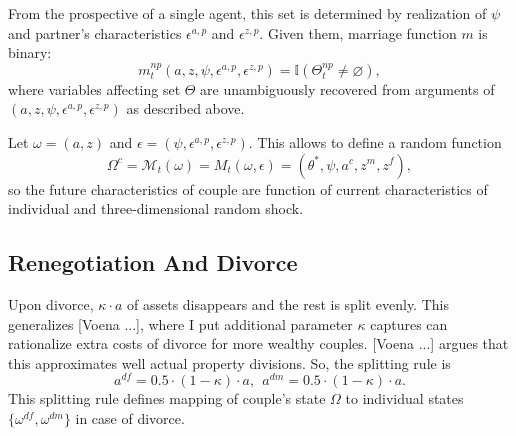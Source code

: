 \documentclass[12pt,letter]{article}
\newcommand{\I}{\mathbb{I}}
\begin{document}
From the prospective of a single agent, this set is determined by realization of $\psi$ and partner's characteristics $\epsilon^{a,p}$ and $\epsilon^{z,p}$. Given them, marriage function $m$ is binary:
\[m^{np}_t(a,z,\psi,\epsilon^{a,p},\epsilon^{z,p}) = \I(\Theta^{np}_t \neq \varnothing),\]
where variables affecting set $\Theta$ are unambiguously recovered from arguments of $(a,z,\psi,\epsilon^{a,p},\epsilon^{z,p})$ as described above.


Let $\omega = (a,z)$ and $\epsilon = (\psi,\epsilon^{a,p},\epsilon^{z,p})$. This allows to define a random function
\[\Omega^c = \mathcal{M}_t(\omega) = M_t(\omega,\epsilon) = (\theta^*,\psi,a^c,z^m,z^f),\]
so the future characteristics of couple are function of current characteristics of individual and three-dimensional random shock.
\subsection{Renegotiation And Divorce}

Upon divorce, $\kappa\cdot a$ of assets disappears and the rest is split evenly. This generalizes [Voena ...], where I put additional parameter $\kappa$ captures can rationalize extra costs of divorce for more wealthy couples. [Voena ...] argues that this approximates well actual property divisions. So, the splitting rule is
\[a^{df} = 0.5\cdot (1-\kappa)\cdot a,  \ \ a^{dm} = 0.5\cdot (1-\kappa)\cdot a.\]
This splitting rule defines mapping of couple's state $\Omega$ to individual states $\{\omega^{df},\omega^{dm}\}$ in case of divorce. 
\end{document}
